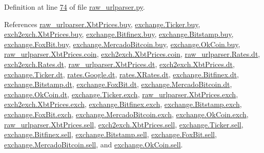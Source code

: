 Definition at line \hyperlink{raw__urlparser_8py_source_l00074}{74} of file \hyperlink{raw__urlparser_8py_source}{raw\+\_\+urlparser.\+py}.



References \hyperlink{raw__urlparser_8py_source_l00055}{raw\+\_\+urlparser.\+Xbt\+Prices.\+buy}, \hyperlink{exchange_8py_source_l00058}{exchange.\+Ticker.\+buy}, \hyperlink{exch2exch_8py_source_l00059}{exch2exch.\+Xbt\+Prices.\+buy}, \hyperlink{exchange_8py_source_l00323}{exchange.\+Bitfinex.\+buy}, \hyperlink{exchange_8py_source_l00392}{exchange.\+Bitstamp.\+buy}, \hyperlink{exchange_8py_source_l00464}{exchange.\+Fox\+Bit.\+buy}, \hyperlink{exchange_8py_source_l00526}{exchange.\+Mercado\+Bitcoin.\+buy}, \hyperlink{exchange_8py_source_l00591}{exchange.\+Ok\+Coin.\+buy}, \hyperlink{raw__urlparser_8py_source_l00057}{raw\+\_\+urlparser.\+Xbt\+Prices.\+coin}, \hyperlink{exch2exch_8py_source_l00065}{exch2exch.\+Xbt\+Prices.\+coin}, \hyperlink{raw__urlparser_8py_source_l00024}{raw\+\_\+urlparser.\+Rates.\+dt}, \hyperlink{exch2exch_8py_source_l00028}{exch2exch.\+Rates.\+dt}, \hyperlink{raw__urlparser_8py_source_l00053}{raw\+\_\+urlparser.\+Xbt\+Prices.\+dt}, \hyperlink{exch2exch_8py_source_l00057}{exch2exch.\+Xbt\+Prices.\+dt}, \hyperlink{exchange_8py_source_l00057}{exchange.\+Ticker.\+dt}, \hyperlink{rates_8py_source_l00087}{rates.\+Google.\+dt}, \hyperlink{rates_8py_source_l00143}{rates.\+X\+Rates.\+dt}, \hyperlink{exchange_8py_source_l00330}{exchange.\+Bitfinex.\+dt}, \hyperlink{exchange_8py_source_l00399}{exchange.\+Bitstamp.\+dt}, \hyperlink{exchange_8py_source_l00463}{exchange.\+Fox\+Bit.\+dt}, \hyperlink{exchange_8py_source_l00533}{exchange.\+Mercado\+Bitcoin.\+dt}, \hyperlink{exchange_8py_source_l00598}{exchange.\+Ok\+Coin.\+dt}, \hyperlink{exchange_8py_source_l00055}{exchange.\+Ticker.\+exch}, \hyperlink{raw__urlparser_8py_source_l00056}{raw\+\_\+urlparser.\+Xbt\+Prices.\+exch}, \hyperlink{exch2exch_8py_source_l00064}{exch2exch.\+Xbt\+Prices.\+exch}, \hyperlink{exchange_8py_source_l00317}{exchange.\+Bitfinex.\+exch}, \hyperlink{exchange_8py_source_l00389}{exchange.\+Bitstamp.\+exch}, \hyperlink{exchange_8py_source_l00457}{exchange.\+Fox\+Bit.\+exch}, \hyperlink{exchange_8py_source_l00523}{exchange.\+Mercado\+Bitcoin.\+exch}, \hyperlink{exchange_8py_source_l00588}{exchange.\+Ok\+Coin.\+exch}, \hyperlink{raw__urlparser_8py_source_l00054}{raw\+\_\+urlparser.\+Xbt\+Prices.\+sell}, \hyperlink{exch2exch_8py_source_l00058}{exch2exch.\+Xbt\+Prices.\+sell}, \hyperlink{exchange_8py_source_l00059}{exchange.\+Ticker.\+sell}, \hyperlink{exchange_8py_source_l00324}{exchange.\+Bitfinex.\+sell}, \hyperlink{exchange_8py_source_l00393}{exchange.\+Bitstamp.\+sell}, \hyperlink{exchange_8py_source_l00465}{exchange.\+Fox\+Bit.\+sell}, \hyperlink{exchange_8py_source_l00527}{exchange.\+Mercado\+Bitcoin.\+sell}, and \hyperlink{exchange_8py_source_l00592}{exchange.\+Ok\+Coin.\+sell}.



